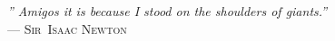 {\sffamily\itshape
'' Amigos
it is because I stood on the shoulders of giants.''\\
}
--- \textsc{Sir~Isaac Newton}